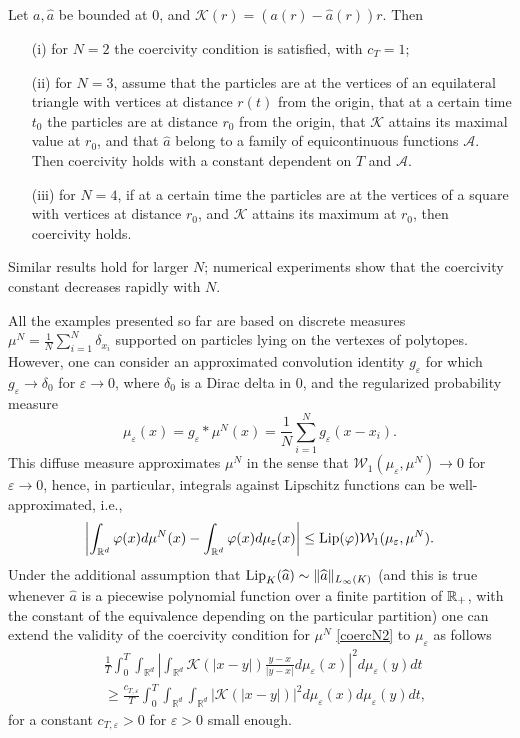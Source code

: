 \begin{proposition}
Let $a, \widehat a$ be bounded at $0$, and $\mathcal K(r) = (a(r) - \widehat a(r)) r$.
Then
\begin{itemize}
\item[(i)] for $N=2$ the coercivity condition is satisfied, with $c_T=1$;
\item[(ii)] for $N=3$, assume that the particles are at the vertices of an equilateral triangle with vertices at distance $r(t)$ from the origin, that at a certain time $t_0$ the particles are  at distance $r_0$ from the origin, that $\mathcal{K}$ attains its maximal value at $r_0$, and that $\hat a$ belong to a family of equicontinuous functions $\mathcal{A}$. Then coercivity holds with a constant dependent on $T$ and $\mathcal{A}$.
\item[(iii)] for $N=4$, if at a certain time the particles are at the vertices of a square with vertices at distance $r_0$, and $\mathcal K$ attains its maximum at $r_0$, then coercivity holds.
\end{itemize}
Similar results hold for larger $N$; numerical experiments show that the coercivity constant decreases rapidly with $N$.
\label{p:disccoerc}
\end{proposition}

All the examples presented so far are based on discrete measures $\mu^N=\frac{1}{N} \sum_{i=1}^N\delta_{x_i}$ supported on particles lying on the vertexes of polytopes. However, one can consider an approximated convolution identity $g_\varepsilon$ for which $g_\varepsilon \to \delta_0$ for $\varepsilon \to 0$, where $\delta_0$ is a Dirac delta in $0$, and  the regularized probability measure
$$
\mu_\varepsilon(x) = g_\varepsilon * \mu^N (x)= \frac{1}{N} \sum_{i=1}^N g_\varepsilon (x-x_i).
$$
This diffuse measure approximates $\mu^N$ in the sense that $\mathcal W_1(\mu_\varepsilon,\mu^N) \to 0$ for $\varepsilon \to 0$, hence, in particular, integrals against Lipschitz functions can be well-approximated, i.e.,
$$
\left | \int_{\mathbb R^d} \varphi(x) d \mu^N(x) -\int_{\mathbb R^d}  \varphi(x) d \mu_\varepsilon(x) \right | \leq \textup{Lip}(\varphi) \mathcal W_1(\mu_\varepsilon,\mu^N) .
$$
Under the additional assumption that $\textup{Lip}_K(\widehat a) \sim \| \widehat a \|_{L_\infty(K)}$ (and this is true whenever $\widehat a$ is a piecewise polynomial function over a finite partition of $\mathbb{R}_+$, with the constant of the equivalence depending on the particular partition) one can extend the validity of the coercivity condition for $\mu^N$ \eqref{coercN2} 
to $\mu_\varepsilon$ as follows
\begin{align*}
&\frac{1}{T} \int_0^T \int_{\mathbb R^d}  \left | \int_{\mathbb R^d}  \mathcal K(|x-y|) \frac{y-x}{|y-x|} d \mu_\varepsilon(x) \right |^2 d\mu_\varepsilon(y) dt \\
& \geq  \frac{c_{T,\varepsilon }}{T} \int_0^T  \int_{\mathbb R^d}  \int_{\mathbb R^d}  |\mathcal K(|x-y|)|^2    d\mu_\varepsilon(x) d\mu_\varepsilon(y)dt,
\end{align*}
for a constant $c_{T,\varepsilon }>0$ for $\varepsilon>0$ small enough.
\\


